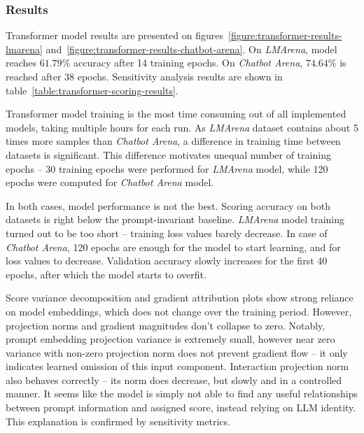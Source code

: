 \documentclass[a4paper,11pt,twoside]{report}
\theoremstyle{definition}
\begin{document}
\subsubsection{Results}

Transformer model results are presented on figures~\ref{figure:transformer-results-lmarena} and~\ref{figure:transformer-results-chatbot-arena}. On \textit{LMArena}, model reaches $61.79 \%$ accuracy after 14 training epochs. On \textit{Chatbot Arena}, $74.64 \%$ is reached after 38 epochs. Sensitivity analysis results are shown in table~\ref{table:transformer-scoring-results}.

Transformer model training is the most time consuming out of all implemented models, taking multiple hours for each run. As \textit{LMArena} dataset contains about 5 times more samples than \textit{Chatbot Arena}, a difference in training time between datasets is significant. This difference motivates unequal number of training epochs -- 30 training epochs were performed for \textit{LMArena} model, while 120 epochs were computed for \textit{Chatbot Arena} model.

In both cases, model performance is not the best. Scoring accuracy on both datasets is right below the prompt-invariant baseline. \textit{LMArena} model training turned out to be too short -- training loss values barely decrease. In case of \textit{Chatbot Arena}, 120 epochs are enough for the model to start learning, and for loss values to decrease. Validation accuracy slowly increases for the first 40 epochs, after which the model starts to overfit.

Score variance decomposition and gradient attribution plots show strong reliance on model embeddings, which does not change over the training period. However, projection norms and gradient magnitudes don't collapse to zero. Notably, prompt embedding projection variance is extremely small, however near zero variance with non-zero projection norm does not prevent gradient flow -- it only indicates learned omission of this input component. Interaction projection norm also behaves correctly -- its norm does decrease, but slowly and in a controlled manner. It seems like the model is simply not able to find any useful relationships between prompt information and assigned score, instead relying on LLM identity. This explanation is confirmed by sensitivity metrics.
\end{document}

